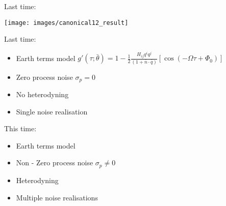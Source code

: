 \documentclass[10pt]{beamer}
\title{}
\subtitle{}
\author{}
\date{EE/GW meeting, May 25, 2023}
\begin{document}
	
	\maketitle
	
	\begin{frame}{}
		
		Last time: 
		
\texttt{[image: images/canonical12\_result]}


\end{frame}


	\begin{frame}{}
	
	Last time: 
	
	\begin{itemize}
		\item Earth terms model $g'(\tau; \bar{\theta}) = 1 - \frac{1}{2} \frac{ H_{ij}q^i q^j }{(1 + \bar{n}\cdot \bar{q}) } \left[ \cos(-\Omega \tau +\Phi_0) \right]$
		\item Zero process noise  $\sigma_p = 0$
		\item No heterodyning
		\item Single noise realisation
    \end{itemize}	

\end{frame}



	\begin{frame}{}
	
	This time: 
	
	\begin{itemize}
		\item Earth terms model 
		\item \alert{Non - Zero process noise  $\sigma_p \neq 0$}
		\item \alert{Heterodyning}
		\item \alert{Multiple noise realisations}
	\end{itemize}	
	
\end{frame}
\end{document}
